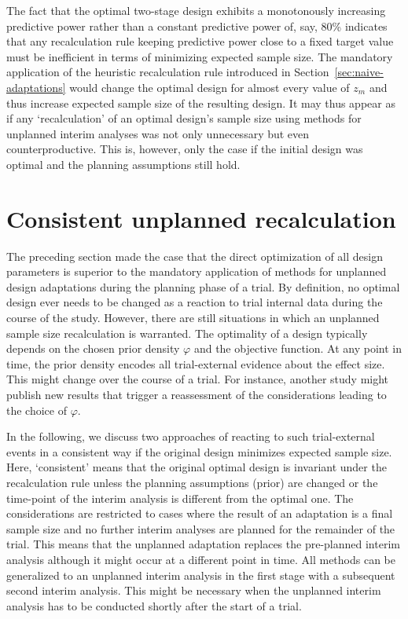 \documentclass{article}
\begin{document}
The fact that the optimal two-stage design exhibits a monotonously increasing
predictive power rather than a constant predictive power of, say, 80\%
indicates that any recalculation rule keeping predictive power
close to a fixed target value must be inefficient in terms of minimizing expected sample size. 
The mandatory application of the heuristic recalculation rule introduced in Section~\ref{sec:naive-adaptations} would change the optimal design for almost every value of $z_m$ and thus increase expected sample size
of the resulting design.
It may thus appear as if any `recalculation' of an optimal design's sample size using methods 
for unplanned interim analyses was not only 
unnecessary but even counterproductive.
This is, however, only the case if the initial design was optimal and
the planning assumptions still hold.


\section{Consistent unplanned recalculation}
\label{sec:unplanned-adaptation}

The preceding section made the case that the direct optimization of all design parameters is superior to the mandatory application of methods for unplanned design adaptations during the planning phase of a trial.
By definition, 
no optimal design ever needs to be changed as a reaction to trial internal data during the course of the study.
However, there are still situations in which an unplanned sample size recalculation is warranted.
The optimality of a design typically depends on the chosen prior density $\varphi$ and the objective function.
At any point in time, 
the prior density encodes all trial-external evidence 
about the effect size.
This might change over the course of a trial.
For instance, another study might publish new results that trigger a reassessment of the considerations leading to the choice of $\varphi$.

In the following, we discuss two approaches of reacting to such trial-external events in a consistent way 
if the original design minimizes expected sample size. 
Here, `consistent' means that the original optimal design is invariant under
the recalculation rule unless the planning assumptions (prior) are changed or
the time-point of the interim analysis is different from the optimal one.
The considerations are restricted to cases where the result of an adaptation is a final sample size and no further interim analyses are planned for the remainder of the trial.
This means that the unplanned adaptation replaces the pre-planned interim analysis although it might occur at a different point in time. 
All methods can be generalized to an unplanned interim analysis in the
first stage with a subsequent second interim analysis.
This might be necessary when the unplanned interim analysis has to
be conducted shortly after the start of a trial.
\end{document}
